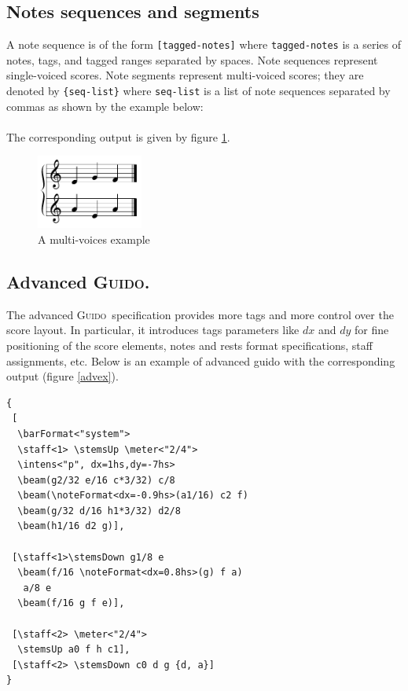 \documentclass[twoside,10pt,a4paper]{article}
\newenvironment{gmnsyntax}		{\vspace{-2mm}\small}{\vspace{-2mm}}
\newcommand{\Guido}	{\textsc{Guido}}
\newcommand{\code}[1]	{{\small \texttt{#1}}}
\newcommand{\codeindent}	{\\ \hspace*{9mm}}
\begin{document}
\subsection{Notes sequences and segments}
A note sequence is of the form \verb+[tagged-notes]+ where \code{tagged-notes} is a series of notes, tags, and tagged ranges separated by spaces. Note sequences represent single-voiced scores.
Note segments represent multi-voiced scores; they are denoted by \verb+{seq-list}+ where \code{seq-list} is a list of note sequences separated by commas as shown by the example below:
\codeindent\code{ \{ [ e g f ], [ a e a ] \} } \\
The corresponding output is given by figure \ref{ex1}.

\begin{figure}[h]
	\centering \includegraphics[width=35mm]{rsrc/voices}
 \caption{A multi-voices example}
 \label{ex1}
\end{figure}


\subsection{Advanced \Guido.}
The advanced \Guido\ specification provides more tags and more control over the score layout.
In particular, it introduces tags parameters like $dx$ and $dy$ for fine positioning of the score elements, notes and rests format specifications, staff assignments, etc. 
Below is an example of advanced guido with the corresponding output (figure \ref{advex}).

\begin{gmnsyntax} 
\begin{verbatim} 
{
 [
  \barFormat<"system">
  \staff<1> \stemsUp \meter<"2/4"> 
  \intens<"p", dx=1hs,dy=-7hs>
  \beam(g2/32 e/16 c*3/32) c/8 
  \beam(\noteFormat<dx=-0.9hs>(a1/16) c2 f) 
  \beam(g/32 d/16 h1*3/32) d2/8 
  \beam(h1/16 d2 g)],

 [\staff<1>\stemsDown g1/8 e
  \beam(f/16 \noteFormat<dx=0.8hs>(g) f a) 
   a/8 e 
  \beam(f/16 g f e)],

 [\staff<2> \meter<"2/4"> 
  \stemsUp a0 f h c1],
 [\staff<2> \stemsDown c0 d g {d, a}]
}
\end{verbatim} 
\end{gmnsyntax} 
\end{document}
